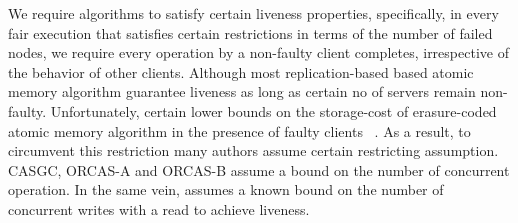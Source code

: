  We require algorithms to satisfy certain liveness properties, specifically, in every fair execution that satisfies certain restrictions in terms of the number of failed nodes, we require every operation by a non-faulty client 
completes, irrespective of the behavior of other clients.  
Although most replication-based based atomic memory algorithm guarantee liveness as long as certain no of servers remain 
non-faulty.  Unfortunately, certain lower bounds on the storage-cost of erasure-coded atomic memory algorithm in the presence of faulty clients ~\cite{cadambe2016information, SCCK15}. As a result, to  circumvent this restriction many authors assume certain restricting 
assumption.  CASGC, ORCAS-A and ORCAS-B assume a bound on the number of concurrent operation. In the same vein, \treasmod{} assumes a known bound on the number of concurrent writes with a read to achieve liveness. 
